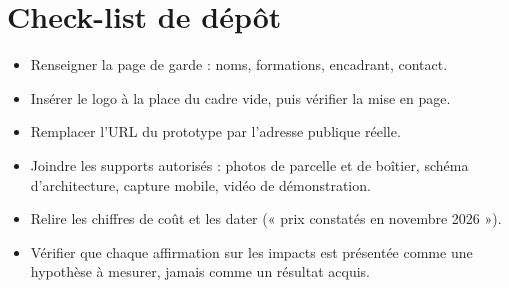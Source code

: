 \documentclass[12pt, a4paper]{article}
\begin{document}
\section{Check-list de dépôt}

\begin{itemize}
  \item Renseigner la page de garde : noms, formations, encadrant, contact.
  \item Insérer le logo à la place du cadre vide, puis vérifier la mise en page.
  \item Remplacer l'URL du prototype par l'adresse publique réelle.
  \item Joindre les supports autorisés : photos de parcelle et de boîtier, schéma
        d'architecture, capture mobile, vidéo de démonstration.
  \item Relire les chiffres de coût et les dater (« prix constatés en novembre 2026 »).
  \item Vérifier que chaque affirmation sur les impacts est présentée comme une hypothèse
        à mesurer, jamais comme un résultat acquis.
\end{itemize}
\end{document}
